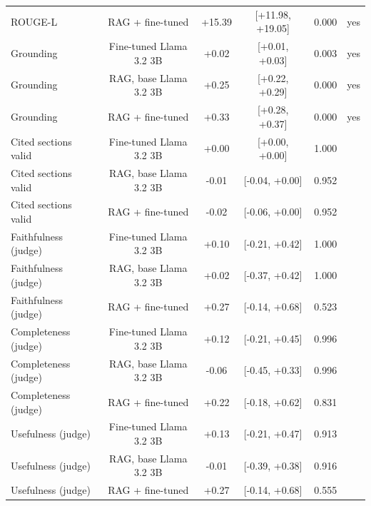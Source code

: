 \documentclass[11pt,a4paper]{article}
\begin{document}
\begin{table}[htbp]
{\begin{tabular}{@{}lccccc@{}}
ROUGE-L & RAG + fine-tuned & +15.39 & [+11.98, +19.05] & 0.000 & yes \\
Grounding & Fine-tuned Llama 3.2 3B & +0.02 & [+0.01, +0.03] & 0.003 & yes \\
Grounding & RAG, base Llama 3.2 3B & +0.25 & [+0.22, +0.29] & 0.000 & yes \\
Grounding & RAG + fine-tuned & +0.33 & [+0.28, +0.37] & 0.000 & yes \\
Cited sections valid & Fine-tuned Llama 3.2 3B & +0.00 & [+0.00, +0.00] & 1.000 &  \\
Cited sections valid & RAG, base Llama 3.2 3B & -0.01 & [-0.04, +0.00] & 0.952 &  \\
Cited sections valid & RAG + fine-tuned & -0.02 & [-0.06, +0.00] & 0.952 &  \\
Faithfulness (judge) & Fine-tuned Llama 3.2 3B & +0.10 & [-0.21, +0.42] & 1.000 &  \\
Faithfulness (judge) & RAG, base Llama 3.2 3B & +0.02 & [-0.37, +0.42] & 1.000 &  \\
Faithfulness (judge) & RAG + fine-tuned & +0.27 & [-0.14, +0.68] & 0.523 &  \\
Completeness (judge) & Fine-tuned Llama 3.2 3B & +0.12 & [-0.21, +0.45] & 0.996 &  \\
Completeness (judge) & RAG, base Llama 3.2 3B & -0.06 & [-0.45, +0.33] & 0.996 &  \\
Completeness (judge) & RAG + fine-tuned & +0.22 & [-0.18, +0.62] & 0.831 &  \\
Usefulness (judge) & Fine-tuned Llama 3.2 3B & +0.13 & [-0.21, +0.47] & 0.913 &  \\
Usefulness (judge) & RAG, base Llama 3.2 3B & -0.01 & [-0.39, +0.38] & 0.916 &  \\
Usefulness (judge) & RAG + fine-tuned & +0.27 & [-0.14, +0.68] & 0.555 &  \\
\bottomrule
\end{tabular}}
\end{table}
\end{document}
